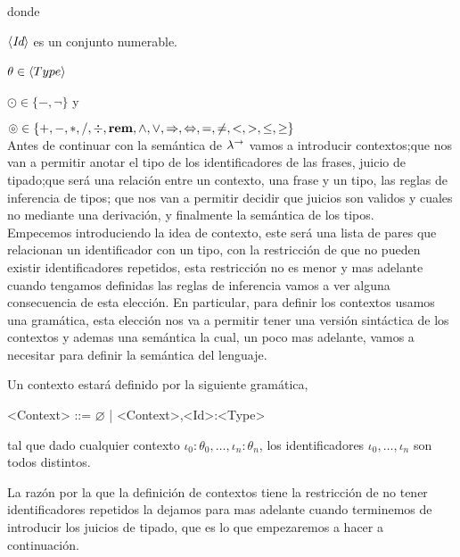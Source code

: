 \noindent
donde \ 

$\langle \textit{Id} \rangle$ es un conjunto numerable.

$\theta \in \langle Type \rangle$ \

$\odot \in \{-, \neg\}$ y \

$\circledcirc \in \{+,-,*,/,\div,\textbf{rem},\wedge,\vee,\Rightarrow,\Leftrightarrow, =,\neq,<,>,\leq,\geq\}$\\

Antes de continuar con la sem\'antica de $\lambda^{\rightarrow}$
vamos a introducir contextos;que nos van a permitir anotar el tipo
de los identificadores de las frases, juicio de tipado;que ser\'a una relaci\'on
entre un contexto, una frase y un tipo, las reglas de inferencia de tipos;
que nos van a permitir decidir que juicios son validos y cuales no mediante una derivaci\'on, y
finalmente la sem\'antica de los tipos.\\

Empecemos introduciendo la idea de contexto, este ser\'a una lista 
de pares que relacionan un identificador 
con un tipo, con la restricci\'on de que no pueden
existir identificadores repetidos, esta restricci\'on no es menor y mas
adelante cuando tengamos definidas las reglas de inferencia vamos a
ver alguna consecuencia de esta elecci\'on. En particular, para
definir los contextos usamos una gram\'atica, esta elecci\'on 
nos va a permitir tener una versi\'on sint\'actica de los contextos
y ademas una sem\'antica la cual, un poco mas adelante, vamos a
necesitar para definir la sem\'antica del lenguaje.

\begin{definition}\label{lambdaa:context}

Un contexto estar\'a definido por la siguiente gram\'atica,\

\begin{grammar}

<Context> ::= $\varnothing$ | <Context>,<Id>:<Type>

\end{grammar}

tal que dado cualquier contexto $\iota_0:\theta_0,\ldots,\iota_n:\theta_n$, los
identificadores $\iota_0,\ldots,\iota_n$ son todos distintos.

\end{definition}

La razón por la que la definici\'on de contextos tiene la restricci\'on de
no tener identificadores repetidos la
dejamos para mas adelante cuando terminemos de introducir los juicios de tipado, 
que es lo que empezaremos a hacer a continuaci\'on.


